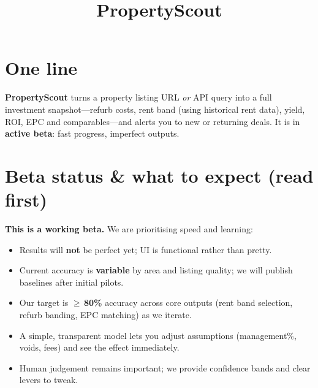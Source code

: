 \documentclass[11pt,a4paper]{article}
\newcommand{\product}{PropertyScout}
\begin{document}
\title{\product}
\author{}
\date{}
\maketitle

\section*{One line}
\textbf{\product} turns a property listing URL \emph{or} API query into a full investment snapshot---refurb costs, rent band (using historical rent data), yield, ROI, EPC and comparables---and alerts you to new or returning deals. It is in \textbf{active beta}: fast progress, imperfect outputs.

\section*{Beta status \& what to expect (read first)}
\textbf{This is a working beta.} We are prioritising speed and learning:
\begin{itemize}
  \item Results will \textbf{not} be perfect yet; UI is functional rather than pretty.
  \item Current accuracy is \textbf{variable} by area and listing quality; we will publish baselines after initial pilots.
  \item Our target is \textbf{$\geq$\,80\%} accuracy across core outputs (rent band selection, refurb banding, EPC matching) as we iterate.
  \item A simple, transparent model lets you adjust assumptions (management\%, voids, fees) and see the effect immediately.
  \item Human judgement remains important; we provide confidence bands and clear levers to tweak.
\end{itemize}
\end{document}
